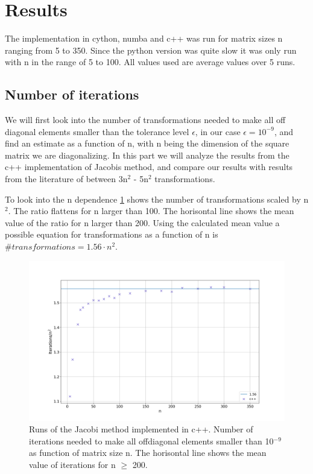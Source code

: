 \section*{Results}

The implementation in cython, numba and c++ was run for matrix sizes n ranging from 5
to 350. Since the python version was quite slow it was only run with n in the
range of 5 to 100. All values used are average values over 5 runs.


\subsection*{Number of iterations}

We will first look into the number of transformations needed to make all off
diagonal elements smaller than the tolerance level $\epsilon$, in our case
$\epsilon = 10^{-9}$, and find an estimate as a function of n, with n being the
dimension of the square matrix we are diagonalizing. In this part we will
analyze the results from the c++ implementation of Jacobis method, and compare
our results with results from the literature of between 3n$^2$ - 5n$^2$ \cite{lectures}
transformations.

To look into the n dependence \cref{fig:iterations_scaled} shows the number of
transformations scaled by n$^2$. The ratio flattens for n larger than 100. The
horisontal line shows the mean value of the ratio for n larger than 200. Using
the calculated mean value a possible equation for transformations as a function
of n is $\#transformations = 1.56\cdot n^2$.

\begin{figure}[H]
  \centering
  \includegraphics[width=1.0\textwidth]{../figures/iterations_compare_n2.png}
  \caption{Runs of the Jacobi method implemented in c++. Number of iterations
  needed to make all offdiagonal elements smaller than 10$^{-9}$ as function of
  matrix size n. The horisontal line shows the mean value of iterations for
  n $\geq$ 200.}

  \label{fig:iterations_scaled}
\end{figure}


